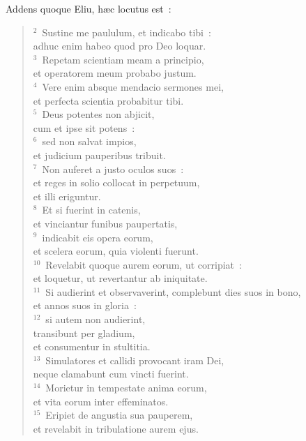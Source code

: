 \lettrine[lines=3,image=true,loversize=0.05,lraise=-0.03]{A}{}ddens quoque Eliu, h\ae c locutus est~:
\begin{flushleft}\begin{verse}\vspace{6pt}${}^{2}$~Sustine me paululum, et indicabo tibi~:\\ adhuc enim habeo quod pro Deo loquar.\\
${}^{3}$~Repetam scientiam meam a principio,\\ et operatorem meum probabo justum.\\
${}^{4}$~Vere enim absque mendacio sermones mei,\\ et perfecta scientia probabitur tibi.\\
${}^{5}$~Deus potentes non abjicit,\\ cum et ipse sit potens~:\\
${}^{6}$~sed non salvat impios,\\ et judicium pauperibus tribuit.\\
${}^{7}$~Non auferet a justo oculos suos~:\\ et reges in solio collocat in perpetuum,\\ et illi eriguntur.\\
${}^{8}$~Et si fuerint in catenis,\\ et vinciantur funibus paupertatis,\\
${}^{9}$~indicabit eis opera eorum,\\ et scelera eorum, quia violenti fuerunt.\\
${}^{10}$~Revelabit quoque aurem eorum, ut corripiat~:\\ et loquetur, ut revertantur ab iniquitate.\\
${}^{11}$~Si audierint et observaverint, complebunt dies suos in bono,\\ et annos suos in gloria~:\\
${}^{12}$~si autem non audierint,\\ transibunt per gladium,\\ et consumentur in stultitia.\\
${}^{13}$~Simulatores et callidi provocant iram Dei,\\ neque clamabunt cum vincti fuerint.\\
${}^{14}$~Morietur in tempestate anima eorum,\\ et vita eorum inter effeminatos.\\
${}^{15}$~Eripiet de angustia sua pauperem,\\ et revelabit in tribulatione aurem ejus.\\

\end{verse}
\end{flushleft}
